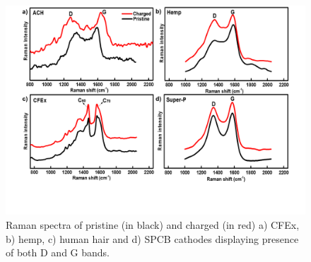 \documentclass{article}
\begin{document}
 \begin{figure}[h!]
  \centering
  \includegraphics[width=\textwidth]{fig/raman}
    \caption{Raman spectra of pristine (in black) and charged (in red) a) CFEx, b) hemp, c) human hair and d) SPCB cathodes displaying presence of both D and G bands.}
  \label{fig:raman}
\end{figure}
\end{document}
